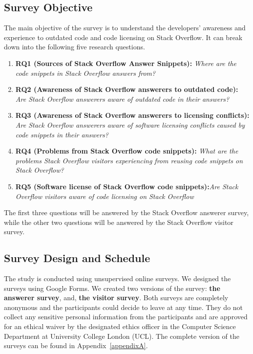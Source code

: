 \documentclass{svjour3}                     %
\begin{document}
\subsection{Survey Objective}
The main objective of the survey is to understand the developers' awareness and
experience to outdated code and code licensing on Stack Overflow. It can break
down into the following five research questions.

\begin{enumerate}
	\item \textbf{RQ1 (Sources of Stack Overflow Answer Snippets):} \textit{Where are the code snippets in Stack Overflow answers from?}
	\item \textbf{RQ2 (Awareness of Stack Overflow answerers to outdated code):} \textit{Are Stack Overflow answerers aware of outdated code in their answers?}
	\item \textbf{RQ3 (Awareness of Stack Overflow answerers to licensing conflicts):} \textit{Are Stack Overflow answerers aware of software licensing
		conflicts caused by code snippets in their answers?}
	\item \textbf{RQ4 (Problems from Stack Overflow code snippets):} \textit{What are the problems Stack Overflow visitors experiencing from reusing code snippets on Stack Overflow?}
	\item \textbf{RQ5 (Software license of Stack Overflow code snippets):}\textit{Are Stack Overflow visitors aware of code licensing on Stack Overflow}
\end{enumerate}

The first three questions will be answered by
the Stack Overflow answerer survey, while the other two questions will be
answered by the Stack Overflow visitor survey.

\subsection{Survey Design and Schedule}
The study is conducted using unsupervised online surveys. We designed the surveys using
Google Forms. We created two versions of the
survey: \textbf{the answerer survey}, and, \textbf{the visitor survey}. Both
surveys are completely anonymous and the participants could decide to leave at
any time. They do not collect any sensitive personal information from the
participants and are approved for an ethical waiver by the designated ethics
officer in the Computer Science Department at University College London (UCL). 
The complete version of the surveys can be found in 
Appendix~\ref{appendixA}.
\end{document}
